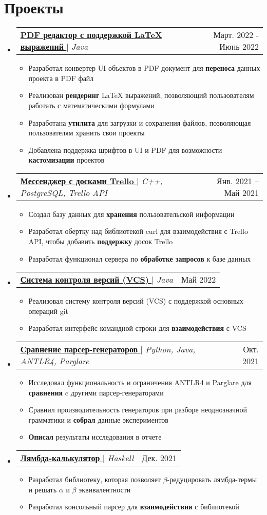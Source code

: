 \documentclass[english,russian,letterpaper,11pt]{article}
\makeatletter
\newcommand{\resumeItem}[1]{
  \item\small{
    {#1 \vspace{-2pt}}
  }
}
\newcommand{\resumeProjectHeading}[2]{
    \item
    \begin{tabular*}{0.97\textwidth}{l@{\extracolsep{\fill}}r}
      \small#1 & #2 \\
    \end{tabular*}\vspace{-7pt}
}
\newcommand{\resumeSubHeadingListStart}{\begin{itemize}[leftmargin=0.15in, label={}]}
\newcommand{\resumeSubHeadingListEnd}{\end{itemize}}
\newcommand{\resumeItemListStart}{\begin{itemize}}
\newcommand{\resumeItemListEnd}{\end{itemize}\vspace{-5pt}}
\makeatother
\begin{document}
\section{Проекты}
    \resumeSubHeadingListStart
    \resumeProjectHeading
          {\href{https://github.com/Pdf-Creator/pdf-editor}{\underline{\textbf{PDF редактор с поддержкой \LaTeX \xspace выражений}} \faGithub} $|$ \emph{Java}}{Март. 2022 - Июнь 2022}
          \resumeItemListStart
            \resumeItem{Разработал конвертер UI объектов в PDF документ для \textbf{переноса} данных проекта в PDF файл}
            \resumeItem{Реализован \textbf{рендеринг} \LaTeX \xspace выражений, позволяющий пользователям работать с математическими формулами}
            \resumeItem{Разработана \textbf{утилита} для загрузки и сохранения файлов, позволяющая пользователям хранить свои проекты}
            \resumeItem{Добавлена поддержка шрифтов в UI и PDF для возможности \textbf{кастомизации} проектов}
          \resumeItemListEnd
    \resumeProjectHeading
    {\href{https://github.com/alexbuyan/BPKproject}{\underline{\textbf{Мессенджер с досками Trello}} \faGithub} $|$ \emph{C++, PostgreSQL, Trello API}}{Янв. 2021 -- Май 2021}
    \resumeItemListStart
      \resumeItem{Создал базу данных для \textbf{хранения} пользовательской информации}
      \resumeItem{Разработал обертку над библиотекой curl для взаимодействия с Trello API, чтобы добавить \textbf{поддержку} досок Trello}
      \resumeItem{Разработал функционал сервера по \textbf{обработке запросов} к базе данных}
    \resumeItemListEnd
    \resumeProjectHeading
        {\href{https://github.com/alexbuyan/VCS}{\underline{\textbf{Система контроля версий (VCS)}} \faGithub} $|$ \emph{Java}}{Май 2022}
        \resumeItemListStart
          \resumeItem{Реализовал систему контроля версий (VCS) с поддержкой основных операций git}
          \resumeItem{Разработал интерфейс командной строки для \textbf{взаимодействия} с VCS}
        \resumeItemListEnd
    \resumeProjectHeading
    {\href{https://github.com/Parser-Comparison/Parser-Comparison}{\underline{\textbf{Сравнение парсер-генераторов}} \faGithub} $|$ \emph{Python, Java, ANTLR4, Parglare}}{Окт. 2021}
    \resumeItemListStart
    \resumeItem{Исследовал функциональность и ограничения ANTLR4 и Parglare для \textbf{сравнения} c другими парсер-генераторами}
    \resumeItem{Сравнил производительность генераторов при разборе неоднозначной грамматики и \textbf{собрал} данные экспериментов}
    \resumeItem{\textbf{Описал} результаты исследования в отчете}
    \resumeItemListEnd
    \resumeProjectHeading
        {\href{https://github.com/alexbuyan/LambdaCalculator}{\underline{\textbf{Лямбда-калькулятор}} \faGithub} $|$ \emph{Haskell}}{Дек. 2021}
        \resumeItemListStart
          \resumeItem{Разработал библиотеку, которая позволяет $\beta$-редуцировать лямбда-термы и решать $\alpha$ и $\beta$ эквивалентности}
          \resumeItem{Разработал консольный парсер для \textbf{взаимодействия} с библиотекой}
        \resumeItemListEnd
    \resumeSubHeadingListEnd
\end{document}

